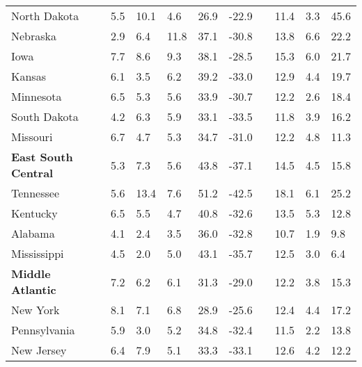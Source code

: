 {\begin{tabular}{p{30mm} R{7mm} R{7mm} R{7mm} R{7mm} 
             R{7mm} p{0mm} R{9mm} R{9mm} R{10mm} }
\hspace{3mm}  North Dakota  & 5.5 & 10.1 & 4.6 & 26.9 & -22.9 &  & 11.4 & 3.3 & 45.6 \\
\hspace{3mm}  Nebraska  & 2.9 & 6.4 & 11.8 & 37.1 & -30.8 &  & 13.8 & 6.6 & 22.2 \\
\hspace{3mm}  Iowa  & 7.7 & 8.6 & 9.3 & 38.1 & -28.5 &  & 15.3 & 6.0 & 21.7 \\
\hspace{3mm}  Kansas  & 6.1 & 3.5 & 6.2 & 39.2 & -33.0 &  & 12.9 & 4.4 & 19.7 \\
\hspace{3mm}  Minnesota  & 6.5 & 5.3 & 5.6 & 33.9 & -30.7 &  & 12.2 & 2.6 & 18.4 \\
\hspace{3mm}  South Dakota  & 4.2 & 6.3 & 5.9 & 33.1 & -33.5 &  & 11.8 & 3.9 & 16.2 \\
\hspace{3mm}  Missouri  & 6.7 & 4.7 & 5.3 & 34.7 & -31.0 &  & 12.2 & 4.8 & 11.3 \\
\hspace{1mm} \textbf{East South Central}  & 5.3 & 7.3 & 5.6 & 43.8 & -37.1 &  & 14.5 & 4.5 & 15.8 \\
\hspace{3mm}  Tennessee  & 5.6 & 13.4 & 7.6 & 51.2 & -42.5 &  & 18.1 & 6.1 & 25.2 \\
\hspace{3mm}  Kentucky  & 6.5 & 5.5 & 4.7 & 40.8 & -32.6 &  & 13.5 & 5.3 & 12.8 \\
\hspace{3mm}  Alabama  & 4.1 & 2.4 & 3.5 & 36.0 & -32.8 &  & 10.7 & 1.9 & 9.8 \\
\hspace{3mm}  Mississippi  & 4.5 & 2.0 & 5.0 & 43.1 & -35.7 &  & 12.5 & 3.0 & 6.4 \\
\hspace{1mm} \textbf{Middle Atlantic}  & 7.2 & 6.2 & 6.1 & 31.3 & -29.0 &  & 12.2 & 3.8 & 15.3 \\
\hspace{3mm}  New York  & 8.1 & 7.1 & 6.8 & 28.9 & -25.6 &  & 12.4 & 4.4 & 17.2 \\
\hspace{3mm}  Pennsylvania  & 5.9 & 3.0 & 5.2 & 34.8 & -32.4 &  & 11.5 & 2.2 & 13.8 \\
\hspace{3mm}  New Jersey  & 6.4 & 7.9 & 5.1 & 33.3 & -33.1 &  & 12.6 & 4.2 & 12.2 \\

\end{tabular}}

